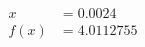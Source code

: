 \documentclass[preview]{standalone}
\begin{document}
\begin{align*}
x &= 0.0024\\f(x) &= 4.0112755
\end{align*}
\end{document}
